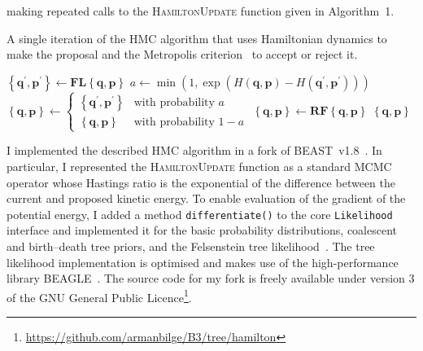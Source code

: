 \documentclass{article}
\renewcommand{\vec}[1]{\ensuremath{\boldsymbol{\mathbf{#1}}}}
\newcommand{\op}[1]{\ensuremath{\boldsymbol{\mathbf{#1}}}}
\begin{document}
        making repeated calls to the \textsc{HamiltonUpdate} function given in
        Algorithm~1.
    \begin{algorithm}
        \caption{A single iteration of the \acl{HMC} algorithm that uses
                 Hamiltonian dynamics to make the proposal and the Metropolis
                 criterion~\cite{Met+53} to accept or reject it.}
        \begin{algorithmic}[1]
        \Function {HamiltonUpdate}{$\left\{\vec{q},\vec{p}\right\}$}
            \State $\left\{\vec{q}^\prime, \vec{p}^\prime\right\}
                \leftarrow \op{F}\op{L}\left\{\vec{q},\vec{p}\right\}$
            \State $a \leftarrow \min\left(1,
                \exp\left(
                    H\left(\vec{q}, \vec{p}\right) - H\left(\vec{q}^\prime,
                        \vec{p}^\prime\right)\right)\right)$
            \State $\left\{\vec{q},\vec{p}\right\} \leftarrow
                \begin{cases}
                    \left\{\vec{q}^\prime, \vec{p}^\prime\right\}
                        & \text{with probability } a \\
                    \left\{\vec{q},\vec{p}\right\}
                        & \text{with probability } 1 - a
                \end{cases}$
            \State $\left\{\vec{q},\vec{p}\right\} \leftarrow
                        \op{R}\op{F}\left\{\vec{q},\vec{p}\right\}$
            \State \Return $\left\{\vec{q},\vec{p}\right\}$
        \EndFunction
        \end{algorithmic}
    \end{algorithm}

    I implemented the described \ac{HMC} algorithm in a fork of
        BEAST~v1.8~\cite{Dru+12}.
    In particular, I represented the \textsc{HamiltonUpdate} function as a
        standard \ac{MCMC} operator whose Hastings ratio is the exponential of
        the difference between the current and proposed kinetic energy.
    To enable evaluation of the gradient of the potential energy, I added a
        method \texttt{differentiate()} to the core \texttt{Likelihood}
        interface and implemented it for the basic probability distributions,
        coalescent and birth--death tree priors, and the Felsenstein tree
        likelihood~\cite{Fel81}.
    The tree likelihood implementation is optimised and makes use of the
        high-performance library BEAGLE~\cite{Ayr+12}.
    The source code for my fork is freely available under version 3 of the GNU
        General Public
        Licence\footnote{\url{https://github.com/armanbilge/B3/tree/hamilton}}.
\end{document}
